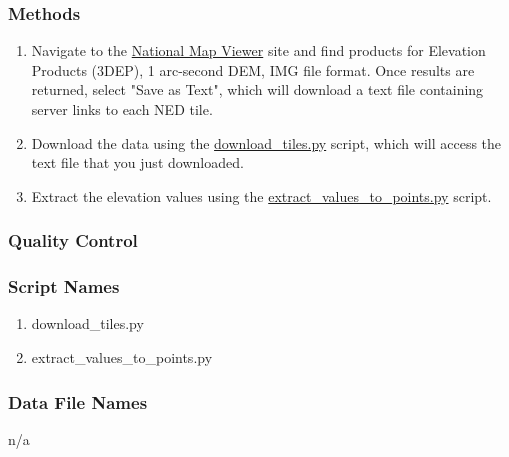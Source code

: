 \subsubsection*{Methods}
\begin{enumerate}
\item Navigate to the \href{https://viewer.nationalmap.gov/basic/?basemap=b1&category=ned,nedsrc&title=3DEP%20View}{National Map Viewer} site and find products for Elevation Products (3DEP), 1 arc-second DEM, IMG file format. Once results are returned, select "Save as Text", which will download a text file containing server links to each NED tile.
\item Download the data using the \href{https://github.com/earthlab/estimate-pm25/blob/master/download-earth-observations/NED/download_tiles.py}{download\_tiles.py} script, which will access the text file that you just downloaded.
\item Extract the elevation values using the \href{https://github.com/earthlab/estimate-pm25/blob/master/download-earth-observations/NED/extract_values_to_points.py}{extract\_values\_to\_points.py} script.
\end{enumerate}
\subsubsection*{Quality Control}
\subsubsection*{Script Names}
\begin{enumerate}
\item download\_tiles.py
\item extract\_values\_to\_points.py
\end{enumerate}
\subsubsection*{Data File Names}
\begin{enumerate}
\tiem n/a
\end{enumerate}